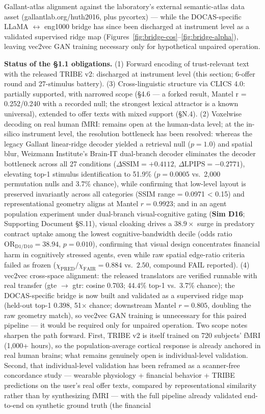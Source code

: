 \documentclass[11pt,twocolumn]{article}
\theoremstyle{plain}
\begin{document}
Gallant-atlas alignment against the laboratory's external semantic-atlas data asset (gallantlab.org/huth2016, plus pycortex) --- while the DOCAS-specific LLaMA $\leftrightarrow$ eng1000 bridge has since been discharged at instrument level as a validated supervised ridge map (Figures~\ref{fig:bridge-cos}--\ref{fig:bridge-alpha}), leaving vec2vec GAN training necessary only for hypothetical unpaired operation.

\textbf{Status of the \S{}1.1 obligations.} (1) Forward encoding of trust-relevant text with the released TRIBE v2: discharged at instrument level (this section; 6-offer round and 27-stimulus battery). (3) Cross-linguistic structure via CLICS 4.0: partially supported, with narrowed scope (\S{}4.6 — a forked result, Mantel r = 0.252/0.240 with a recorded null; the strongest lexical attractor is a known universal), extended to offer texts with mixed support (\S{}N.4). (2) Voxelwise decoding on real human fMRI: remains open at the human-data level; at the in-silico instrument level, the resolution bottleneck has been resolved: whereas the legacy Gallant linear-ridge decoder yielded a retrieval null ($p = 1.0$) and spatial blur, Weizmann Institute's Brain-IT dual-branch decoder \citep{beliy2026} eliminates the decoder bottleneck across all 27 conditions ($\Delta\text{SSIM} = +0.4112$, $\Delta\text{LPIPS} = -0.2771$), elevating top-1 stimulus identification to 51.9\% ($p = 0.0005$ vs.\ 2,000 permutation nulls and 3.7\% chance), while confirming that low-level layout is preserved invariantly across all categories (SSIM range = 0.0971 < 0.15) and representational geometry aligns at Mantel $r = 0.9923$; and in an agent population experiment under dual-branch visual-cognitive gating (\textbf{Sim D16}; Supporting Document \S{}S.11), visual cloaking drives a $38.9\times$ surge in predatory contract uptake among the lowest cognitive-bandwidth decile (odds ratio $\text{OR}_{\text{D1}/\text{D10}} = 38.94$, $p = 0.010$), confirming that visual design concentrates financial harm in cognitively stressed agents, even while raw spatial edge-ratio criteria failed as frozen ($\chi_{\text{PRED}}/\chi_{\text{FAIR}} = 0.884$ vs.\ $2.50$, compound FAIL reported). (4) vec2vec cross-space alignment: the released translators are verified runnable with real transfer (gte $\to$ gtr: cosine 0.703; 44.4\% top-1 vs.\ 3.7\% chance); the DOCAS-specific bridge is now built and validated as a supervised ridge map (held-out top-1 0.398, 51$\times$ chance; downstream Mantel $r = 0.805$, doubling the raw geometry match), so vec2vec GAN training is unnecessary for this paired pipeline --- it would be required only for unpaired operation. Two scope notes sharpen the path forward. First, TRIBE v2 is itself trained on 720 subjects' fMRI (1,000+ hours), so the population-average cortical response is already anchored in real human brains; what remains genuinely open is individual-level validation. Second, that individual-level validation has been reframed as a scanner-free concordance study — wearable physiology + financial behavior + TRIBE predictions on the user's real offer texts, compared by representational similarity rather than by synthesizing fMRI — with the full pipeline already validated end-to-end on synthetic ground truth (the financial 
\end{document}
